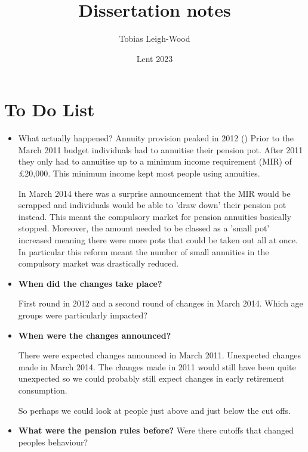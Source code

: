 \documentclass[12pt]{article}
\date{Lent 2023}
\title{Dissertation notes}
\author{Tobias Leigh-Wood}
\begin{document}
\maketitle

\section*{To Do List}
\begin{itemize}
      \item What actually happened?
            Annuity provision peaked in 2012 (\cite{cannon_effect_2016}) Prior to the March 2011 budget individuals had to annuitise their pension pot.
            After 2011 they only had to annuitise up to a minimum income requirement (MIR) of £20,000. This minimum income kept most people using annuities.

            In March 2014 there was a surprise announcement that the MIR would be scrapped and individuals would be able to 'draw down' their pension pot instead.
            This meant the compulsory market for pension annuities basically stopped. Moreover, the amount needed to be classed as a 'small pot' increased meaning there were more pots that could be taken out all at once.
            In particular this reform meant the number of small annuities in the compulsory market was drastically reduced.


      \item \textbf{When did the changes take place?}

            First round in 2012 and a second round of changes in March 2014. Which age groups were particularly impacted?

      \item \textbf{When were the changes announced?}

            There were expected changes announced in March 2011. Unexpected changes made in March 2014.
            The changes made in 2011 would still have been quite unexpected so we could probably still expect changes in early retirement consumption.

            So perhaps we could look at people just above and just below the cut offs.
      \item \textbf{What were the pension rules before?}
            Were there cutoffs that changed peoples behaviour?
            
\end{itemize}




\end{document}
